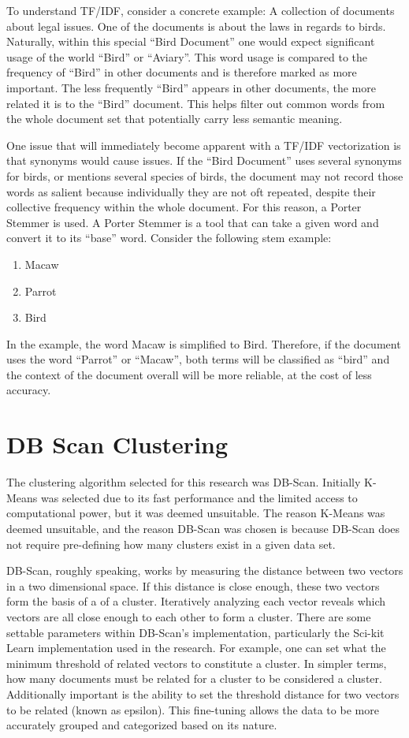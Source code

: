 To understand TF/IDF, consider a concrete example: A collection of
documents about legal issues. One of the documents is about the laws
in regards to birds. Naturally, within this special ``Bird Document''
one would expect significant usage of the world ``Bird'' or
``Aviary''. This word usage is compared to the frequency of ``Bird''
in other documents and is therefore marked as more important. The less
frequently ``Bird'' appears in other documents, the more related it is
to the ``Bird'' document. This helps filter out common words from the
whole document set that potentially carry less semantic meaning.

One issue that will immediately become apparent with a TF/IDF
vectorization is that synonyms would cause issues. If the ``Bird
Document'' uses several synonyms for birds, or mentions several
species of birds, the document may not record those words as salient
because individually they are not oft repeated, despite their
collective frequency within the whole document. For this reason,
a Porter Stemmer is used. A Porter Stemmer is a tool that can take
a given word and convert it to its ``base'' word. Consider the following
stem example:

\begin{enumerate}
\item Macaw
\item Parrot
\item Bird
\end{enumerate}

In the example, the word Macaw is simplified to Bird. Therefore, if
the document uses the word ``Parrot'' or ``Macaw'', both terms will be
classified as ``bird'' and the context of the document overall will be
more reliable, at the cost of less accuracy.

\section{DB Scan Clustering}
The clustering algorithm selected for this research was
DB-Scan. Initially K-Means was selected due to its fast performance
and the limited access to computational power, but it was deemed
unsuitable. The reason K-Means was deemed unsuitable, and the reason
DB-Scan was chosen is because DB-Scan does not require pre-defining
how many clusters exist in a given data set.

DB-Scan, roughly speaking, works by measuring the distance between two
vectors in a two dimensional space. If this distance is close enough,
these two vectors form the basis of a of a cluster. Iteratively
analyzing each vector reveals which vectors are all close enough to
each other to form a cluster. There are some settable parameters
within DB-Scan's implementation, particularly the Sci-kit Learn
implementation used in the research. For example, one can set what the
minimum threshold of related vectors to constitute a cluster. In
simpler terms, how many documents must be related for a cluster to be
considered a cluster. Additionally important is the ability to set the
threshold distance for two vectors to be related (known as
epsilon). This fine-tuning allows the data to be more accurately
grouped and categorized based on its nature.

